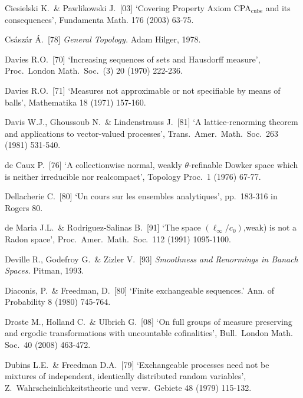 {
Ciesielski K.\ \& Pawlikowski J.\ [03]
`Covering Property Axiom CPA$_{\text{cube}}$ and its consequences',
Fundamenta Math. 176 (2003) 63-75.
\cmmnt{[498C.]}

Cs\'asz\'ar \'A.\ [78] {\it General Topology.}  Adam Hilger, 1978.
\cmmnt{[\S4A2, \S4A5.]}

\medskip%

Davies R.O.\ [70] `Increasing sequences of sets and Hausdorff measure', Proc.\ London Math.\ Soc.\ (3) 20 (1970) 222-236.
\cmmnt{[471G.]}

Davies R.O.\ [71] `Measures not approximable or not specifiable by means
of balls', Mathematika 18 (1971) 157-160.
\cmmnt{[\S466 {\it notes\/}.]}

Davis W.J., Ghoussoub N.\ \& Lindenstrauss J.\ [81] `A lattice-renorming
theorem and applications to vector-valued processes', Trans.\ Amer.\
Math.\ Soc.\ 263 (1981) 531-540.
\cmmnt{[\S467 {\it notes\/}.]}

de Caux P.\ [76] `A collectionwise normal, weakly $\theta$-refinable
Dowker space which is neither irreducible nor realcompact', Topology
Proc.\ 1 (1976) 67-77.
\cmmnt{[439O.]}

Dellacherie C.\ [80] `Un cours sur les ensembles analytiques', pp.\
183-316 in {\smc Rogers 80}.
\cmmnt{[\S432 {\it notes\/}.]}

de Maria J.L.\ \& Rodriguez-Salinas B.\ [91] `The space
$(\ell_{\infty}/c_0)$,weak) is not a Radon space', Proc.\ Amer.\ Math.\
Soc.\ 112 (1991) 1095-1100.
\cmmnt{[466I.]}

Deville R., Godefroy G.\ \& Zizler V.\ [93] {\it Smoothness and
Renormings in Banach Spaces.}  Pitman, 1993.

Diaconis, P.\ \& Freedman, D.\ [80] `Finite exchangeable sequences.'
Ann. of Probability 8 (1980) 745-764.
\cmmnt{[459Xd.] }

Droste M., Holland C.\ \& Ulbrich G.\ [08]
`On full groups of measure preserving and ergodic transformations with
uncountable cofinalities',
Bull.\ London Math. Soc.\ 40 (2008) 463-472.
\cmmnt{[494Q.]}

Dubins L.E.\ \& Freedman D.A.\ [79]
`Exchangeable processes need not be mixtures of independent,
identically distributed random variables',
Z.\ Wahrscheinlichkeitstheorie und verw.\ Gebiete 48 (1979) 115-132.
\cmmnt{[459K.]}

}
